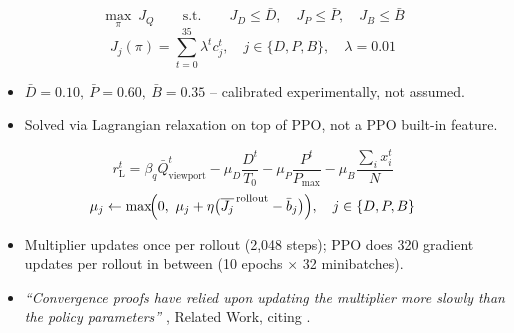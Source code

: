 \documentclass[aspectratio=169]{beamer}
\newcommand{\Dbar}{\bar D}
\newcommand{\Pbar}{\bar P}
\newcommand{\Bbar}{\bar B}
\begin{document}
\begin{frame}
\[
\max_{\pi}\ J_Q \qquad \text{s.t.} \qquad J_D\le\Dbar,\quad J_P\le\Pbar,\quad J_B\le\Bbar
\]
\[
J_j(\pi)=\sum_{t=0}^{35}\lambda^t c_j^t,\quad j\in\{D,P,B\},\quad \lambda=0.01
\]
\begin{itemize}
  \item $\Dbar=0.10,\ \Pbar=0.60,\ \Bbar=0.35$ -- calibrated experimentally, not assumed.
  \item Solved via Lagrangian relaxation on top of PPO, not a PPO built-in feature.
\end{itemize}
\end{frame}

\begin{frame}
\[
r_{\mathrm L}^t=\beta_q\bar Q^t_{\text{viewport}}-\mu_D\frac{D^t}{T_0}-\mu_P\frac{P^t}{P_{\max}}-\mu_B\frac{\sum_i x_i^t}{N}
\]
\[
\mu_j \leftarrow \max\!\Bigl(0,\ \mu_j+\eta\bigl(\overline{J_j}^{\,\text{rollout}}-\bar b_j\bigr)\Bigr), \quad j\in\{D,P,B\}
\]
\begin{itemize}
  \item Multiplier updates once per rollout (2{,}048 steps); PPO does 320 gradient updates per rollout in between (10 epochs $\times$ 32 minibatches).
  \item \emph{``Convergence proofs have relied upon updating the multiplier more slowly than the policy parameters''} \cite{stooke20}, Related Work, citing \cite{tessler18}.
\end{itemize}
\end{frame}
\end{document}
